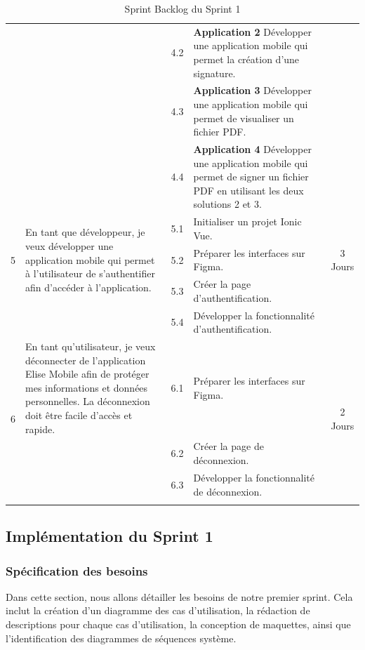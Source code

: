 \begin{adjustwidth}{-1cm}{}
\begin{longtable}{|c|p{6cm}|c|p{6cm}|c|}
    \cline{3-4}
    &  &  4.2 &\textbf{Application 2} Développer une application mobile qui permet la création d'une signature.&\\
    \cline{3-4}
    &  &  4.3 &\textbf{Application 3} Développer une application mobile qui permet de visualiser un fichier PDF.&\\
    \cline{3-4}
    &  &  4.4 &\textbf{Application 4} Développer une application mobile qui permet de signer un fichier PDF en utilisant les deux solutions 2 et 3.&\\
    \cline{1-5}
    \multirow{3}{*}{5} & \multirow{3}{6cm}{En tant que développeur, je veux développer une application mobile qui permet à l'utilisateur de s'authentifier afin d'accéder à l'application.} & 
    
    5.1 &Initialiser un projet Ionic Vue.&\multirow{3}{2cm}{3 Jours}\\
    \cline{3-4}
      & & 5.2 & Préparer les interfaces sur Figma.&\\
    \cline{3-4}
    &  &  5.3 & Créer la page d'authentification. &\\
    \cline{3-4}
    &  &  5.4 & Développer la fonctionnalité d'authentification.&\\
  \hline
  \multirow{3}{*}{6} & En tant qu'utilisateur, je veux déconnecter de l'application Elise Mobile afin de protéger mes informations et données personnelles. La déconnexion doit être facile d'accès et rapide. &  6.1 &Préparer les interfaces sur Figma.&\multirow{3}{2cm}{2 Jours}\\
  \cline{3-4}
  &  &  6.2 &Créer la page de déconnexion.&\\
  \cline{3-4}
  &  &  6.3 &Développer la fonctionnalité de déconnexion.&\\
  \hline
  \caption{Sprint Backlog du Sprint 1}
  \label{tab:sprint-backlog-1}
\end{longtable}
\end{adjustwidth}
\subsection{Implémentation du Sprint 1}


\subsubsection{Spécification des besoins}
Dans cette section, nous allons détailler les besoins de notre premier sprint. Cela inclut la création d'un diagramme des cas d'utilisation, la rédaction de descriptions pour chaque cas d'utilisation, la conception de maquettes, ainsi que l'identification des diagrammes de séquences système.

